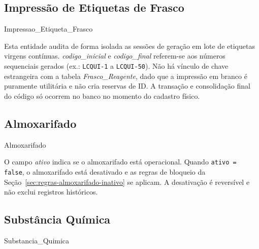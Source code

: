 \subsection{Impressão de Etiquetas de Frasco}

\begin{entidade}{Impressao\_Etiqueta\_Frasco}
\end{entidade}

\begin{explicacao}
Esta entidade audita de forma isolada as sessões de geração em lote de etiquetas virgens contínuas. \textit{codigo\_inicial} e \textit{codigo\_final} referem-se aos números sequenciais gerados (ex.: \texttt{LCQUI-1} a \texttt{LCQUI-50}). Não há vínculo de chave estrangeira com a tabela \textit{Frasco\_Reagente}, dado que a impressão em branco é puramente utilitária e não cria reservas de ID. A transação e consolidação final do código só ocorrem no banco no momento do cadastro físico.
\end{explicacao}

\subsection{Almoxarifado}
\begin{entidade}{Almoxarifado}
\end{entidade}

\begin{explicacao}
O campo \textit{ativo} indica se o almoxarifado está operacional. Quando \texttt{ativo = false}, o almoxarifado está desativado e as regras de bloqueio da Seção~\ref{sec:regras-almoxarifado-inativo} se aplicam. A desativação é reversível e não exclui registros históricos.
\end{explicacao}

\subsection{Substância Química}
\begin{entidade}{Substancia\_Quimica}
\end{entidade}

